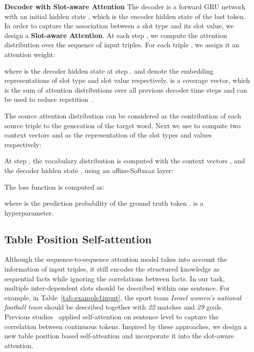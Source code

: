 \documentclass[11pt,a4paper]{article}
\begin{document}
\textbf{Decoder with Slot-aware Attention} The decoder is a forward GRU network with an initial hidden state , which is the encoder hidden state of the last token. In order to capture the association between a slot type and its slot value, we design a \textbf{Slot-aware Attention}. At each step , we compute the attention distribution over the sequence of input triples. For each triple , we assign it an attention weight: 



where  is the decoder hidden state at step .  and  denote the embedding representations of slot type  and slot value  respectively.  is a coverage vector, which is the sum of attention distributions over all previous decoder time steps and can be used to reduce repetition~\cite{hybridp17}.

The source attention distribution  can be considered as the contribution of each source triple to the generation of the target word. Next we use  to compute two context vectors  and  as the representation of the slot types and values respectively:


At step , the vocabulary distribution  is computed with the context vectors ,  and the decoder hidden state , using an affine-Softmax layer:


The loss function is computed as:

where  is the prediction probability of the ground truth token .  is a hyperparameter.



\subsection{Table Position Self-attention}
Although the sequence-to-sequence attention model takes into account the information of input triples, it still encodes the structured knowledge as sequential facts while ignoring the correlations between facts. In our task, multiple inter-dependent slots should be described within one sentence. For example, in Table~\ref{tab:example1input}, the sport team \textit{Israel women's national football team} should be described together with \textit{22} matches and \textit{29} goals.
Previous studies~\cite{lin2017structured,vaswani2017attention} applied self-attention on sentence level to capture the correlation between continuous tokens. Inspired by these approaches, we design a new table position based self-attention and incorporate it into the slot-aware attention.
\end{document}

